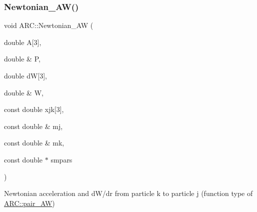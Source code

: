 \subsubsection{\texorpdfstring{Newtonian\+\_\+\+A\+W()}{Newtonian\_AW()}}
{\footnotesize\ttfamily void A\+R\+C\+::\+Newtonian\+\_\+\+AW (\begin{DoxyParamCaption}\item[{double}]{A\mbox{[}3\mbox{]},  }\item[{double \&}]{P,  }\item[{double}]{dW\mbox{[}3\mbox{]},  }\item[{double \&}]{W,  }\item[{const double}]{xjk\mbox{[}3\mbox{]},  }\item[{const double \&}]{mj,  }\item[{const double \&}]{mk,  }\item[{const double $\ast$}]{smpars }\end{DoxyParamCaption})}



Newtonian acceleration and d\+W/dr from particle k to particle j (function type of \hyperlink{namespaceARC_a5c4308ca4a8d0e0ff59fdce30f00274c}{A\+R\+C\+::pair\+\_\+\+AW}) 


